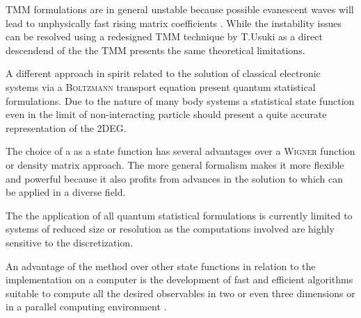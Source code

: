 TMM formulations are in general unstable because possible evanescent waves will lead to unphysically fast rising matrix coefficients \cite{PhysRevB.38.9945}.
While the instability issues can be resolved using a redesigned TMM technique by T.Usuki \cite{PhysRevB.50.7615}\cite{PhysRevB.52.8244} as a direct descendend of the \sdg{} the TMM presents the same theoretical limitations.\par
A different approach in spirit related to the solution of classical electronic systems via a \textsc{Boltzmann} transport equation present quantum statistical formulations. 
Due to the nature of many body systems a statistical state function even in the limit of non-interacting particle should present a quite accurate representation of the 2DEG.\par
The choice of a \gfnc{} as a state function has several advantages over a \textsc{Wigner} function or density matrix approach.
The more general formalism makes it more flexible and powerful because it also profits from advances in the solution to \gfnc{} which can be applied in a diverse field.\par
The the application of all quantum statistical formulations is currently limited to systems of reduced size or resolution as the computations involved are highly sensitive to the discretization.\par
An advantage of the \gfnc{} method over other state functions in relation to the implementation on a computer is the development of fast and efficient algorithms suitable to compute all the desired observables\cite{JApplPhys.91.2343} in two or even three dimensions or in a parallel computing environment \cite{Drouvelis2006parallel}.

